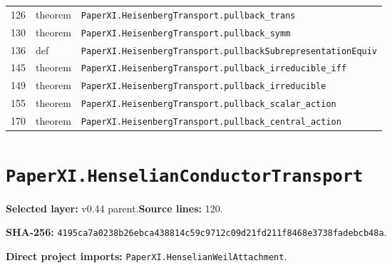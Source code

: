 \documentclass[10pt,oneside]{book}
\begin{document}
\begin{longtable}{@{}p{}p{}p{}@{}}
126&theorem&\nolinkurl{PaperXI.HeisenbergTransport.pullback_trans}\\

130&theorem&\nolinkurl{PaperXI.HeisenbergTransport.pullback_symm}\\

136&def&\nolinkurl{PaperXI.HeisenbergTransport.pullbackSubrepresentationEquiv}\\

145&theorem&\nolinkurl{PaperXI.HeisenbergTransport.pullback_irreducible_iff}\\

149&theorem&\nolinkurl{PaperXI.HeisenbergTransport.pullback_irreducible}\\

155&theorem&\nolinkurl{PaperXI.HeisenbergTransport.pullback_scalar_action}\\

170&theorem&\nolinkurl{PaperXI.HeisenbergTransport.pullback_central_action}\\

\bottomrule\end{longtable}

\section{\texorpdfstring{\nolinkurl{PaperXI.HenselianConductorTransport}}{PaperXI.HenselianConductorTransport}}\label{module:PaperXI.HenselianConductorTransport}

\textbf{Selected layer:} v0.44 parent.\quad\textbf{Source lines:} 120.\par\textbf{SHA-256:} {\scriptsize\nolinkurl{4195ca7a0238b26ebca438814c59c9712c09d21fd211f8468e3738fadebcb48a}}.


\textbf{Direct project imports:} \nolinkurl{PaperXI.HenselianWeilAttachment}.
\end{document}
